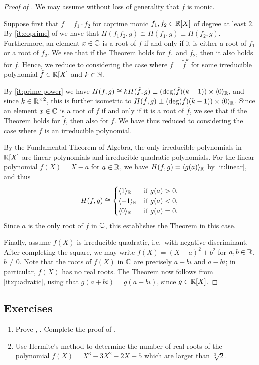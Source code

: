 \documentclass[12pt, leqno, british]{amsart}
\begin{document}
\begin{proof}[Proof of ]
We may assume without loss of generality that $f$ is monic.

Suppose first that $f = f_1 \cdot f_2$ for coprime monic $f_1, f_2 \in \mathbb R[X]$ of degree at least $2$. By \eqref{it:coprime} of  we have that $H(f_1f_2, g) \cong H(f_1, g) \perp H(f_2, g)$.
Furthermore, an element $x \in \mathbb C$ is a root of $f$ if and only if it is either a root of $f_1$ or a root of $f_2$.
We see that if the Theorem holds for $f_1$ and $f_2$, then it also holds for $f$.
Hence, we reduce to considering the case where $f = \tilde{f}^k$ for some irreducible polynomial $\tilde{f} \in \mathbb R[X]$ and $k \in \mathbb N$.

By \eqref{it:prime-power} we have $H(f, g) \cong kH(\tilde{f}, g) \perp (\deg(\tilde{f})(k-1)) \times \langle 0 \rangle_\mathbb R$, and since $k \in \mathbb R^{\times 2}$, this is further isometric to $H(\tilde{f}, g) \perp (\deg(\tilde{f})(k-1)) \times \langle 0 \rangle_\mathbb R$.
Since an element $x \in \mathbb C$ is a root of $f$ if and only if it is a root of $\tilde{f}$, we see that if the Theorem holds for $\tilde{f}$, then also for $f$.
We have thus reduced to considering the case where $f$ is an irreducible polynomial.

By the Fundamental Theorem of Algebra, the only irreducible polynomials in $\mathbb R[X]$ are linear polynomials and irreducible quadratic polynomials.
For the linear polynomial $f(X) = X - a$ for $a \in \mathbb R$, we have $H(f, g) = \langle g(a) \rangle_\mathbb R$ by \eqref{it:linear}, and thus
$$ H(f, g) \cong \begin{cases}
\langle 1 \rangle_{\mathbb R} &\text{if } g(a) > 0, \\
\langle -1 \rangle_{\mathbb R} &\text{if } g(a) < 0, \\
\langle 0 \rangle_{\mathbb R} &\text{if } g(a) = 0.
\end{cases}$$
Since $a$ is the only root of $f$ in $\mathbb C$, this establishes the Theorem in this case.

Finally, assume $f(X)$ is irreducible quadratic, i.e.~with negative discriminant.
After completing the square, we may write $f(X) = (X-a)^2 + b^2$ for $a, b \in \mathbb R$, $b \neq 0$.
Note that the roots of $f(X)$ in $\mathbb C$ are precisely $a+bi$ and $a-bi$; in particular, $f(X)$ has no real roots.
The Theorem now follows from \eqref{it:quadratic}, using that $g(a + bi) = g(a-bi)$, since $g \in \mathbb R[X]$.
\end{proof}

\subsection{Exercises}
\begin{enumerate}
\item Prove , . Complete the proof of .
\item Use Hermite's method to determine the number of real roots of the polynomial $f(X) = X^3 - 3X^2 - 2X + 5$ which are larger than $\sqrt[3]{2}$.
\end{enumerate}
\end{document}
